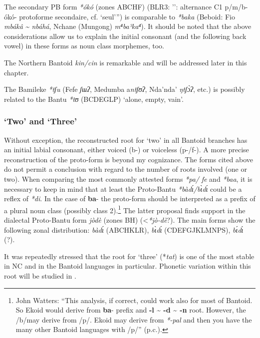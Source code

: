 The secondary PB form \textit{*ókó} (zones ABCHF) (BLR3: ’’\citealt{Janssens1994}: alternance C1 p/m/b-ókó- protoforme secondaire, cf. `seul'”) is comparable to \textit{*baka} (Beboid: Fio \textit{mbákâ} \textit{{\textasciitilde} nbáhá}, Nchane (Mungong) \textit{m⁴ba³ka⁴}). It should be noted that the above considerations allow us to explain the initial consonant (and the following back vowel) in these forms as noun class morphemes, too. 

The Northern Bantoid \textit{kin/cin} is remarkable and will be addressed later in this chapter. 

The Bamileke \textit{*tʃu} (Fefe \textit{ʃɯ}\textit{ʔ}, Medumba a\textit{ntʃʊ}\textit{ʔ}, Nda'nda' \textit{ŋtʃ{\`{ɔ}}ʔ}, etc.) is possibly related to the Bantu \textit{*tʊ} (BCDEGLP) ‘alone, empty, vain’. 

 
\subsubsection{‘Two’ and ‘Three’} %


Without exception, the reconstructed root for `two' in all Bantoid branches has an initial labial consonant, either voiced (b-) or voiceless (p-/f-). A more precise reconstruction of the proto-form is beyond my cognizance. The forms cited above do not permit a conclusion with regard to the number of roots involved (one or two). When comparing the most commonly attested forms \textit{*pa/} \textit{fe} and \textit{*baa}, it is necessary to keep in mind that at least the Proto-Bantu \textit{*bàd{\'{ɩ}}/b{\`{ɩ}}d{\'{ɩ}}} could be a reflex of \textit{*di}. In the case of \textbf{ba}- the proto-form should be interpreted as a prefix of a plural noun class (possibly class 2).\footnote{John Watters: “This analysis, if correct, could work also for most of Bantoid. So Ekoid would derive from \textbf{ba}- prefix and \textbf{-l {\textasciitilde} -d {\textasciitilde} -n} root. However, the /b/may derive from /p/. Ekoid may derive from \textit{*-pal} and then you have the many other Bantoid languages with /p/” (p.c.).} The latter proposal finds support in the dialectal Proto-Bantu form \textit{jòdè} (zones BH) (<\textit{*jò-dè}?). The main forms show the following zonal distribution: \textit{bàd{\'{ɩ}}} (ABCHKLR), \textit{b{\`{ɩ}}d{\'{ɩ}}} (CDEFGJKLMNPS), \textit{b{\'{ɩ}}d{\`{ɩ}}} (?).

  It was repeatedly stressed that the root for `three' (*\textit{tat}) is one of the most stable in NC and in the Bantoid languages in particular. Phonetic variation within this root will be studied in . 

